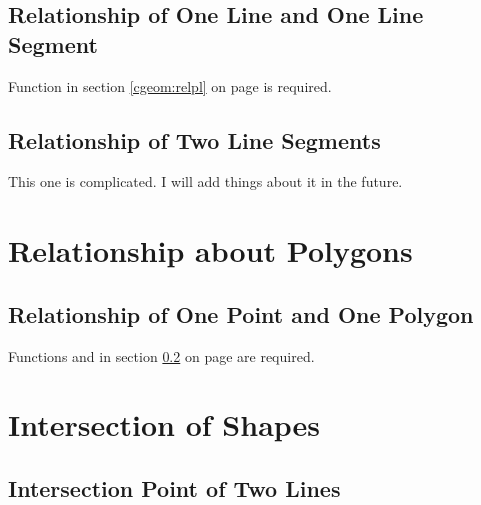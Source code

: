 \subsection{Relationship of One Line and One Line Segment}

Function  in section \ref{cgeom:relpl} on page
\pageref{cgeom:relpl} is required.



\subsection{Relationship of Two Line Segments}
\label{cgeom:relss}

This one is complicated. I will add things about it in the future.




\section{Relationship about Polygons}

\subsection{Relationship of One Point and One Polygon}

Functions  and  in section \ref{cgeom:relss}
on page \pageref{cgeom:relss} are required.




\section{Intersection of Shapes}

\subsection{Intersection Point of Two Lines}




